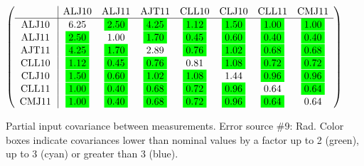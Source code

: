 \begin{table}[H]
\scriptsize
\begin{center}
\renewcommand{\arraystretch}{1.1}
\begin{math}\left(\begin{array}{c|ccccccc}
 & \mathrm{ALJ10} & 
\mathrm{ALJ11} & 
\mathrm{AJT11} & 
\mathrm{CLL10} & 
\mathrm{CLJ10} & 
\mathrm{CLL11} & 
\mathrm{CMJ11} \\
\hline
\mathrm{ALJ10} \hspace*{2pt} &       6.25 &  \colorbox{Green1}{$      2.50$} &  \colorbox{Green1}{$      4.25$} &  \colorbox{Green1}{$      1.12$} &  \colorbox{Green1}{$      1.50$} &  \colorbox{Green1}{$      1.00$} &  \colorbox{Green1}{$      1.00$} \\
\mathrm{ALJ11} \hspace*{2pt} &  \colorbox{Green1}{$      2.50$} &       1.00 &  \colorbox{Green1}{$      1.70$} &  \colorbox{Green1}{$      0.45$} &  \colorbox{Green1}{$      0.60$} &  \colorbox{Green1}{$      0.40$} &  \colorbox{Green1}{$      0.40$} \\
\mathrm{AJT11} \hspace*{2pt} &  \colorbox{Green1}{$      4.25$} &  \colorbox{Green1}{$      1.70$} &       2.89 &  \colorbox{Green1}{$      0.76$} &  \colorbox{Green1}{$      1.02$} &  \colorbox{Green1}{$      0.68$} &  \colorbox{Green1}{$      0.68$} \\
\mathrm{CLL10} \hspace*{2pt} &  \colorbox{Green1}{$      1.12$} &  \colorbox{Green1}{$      0.45$} &  \colorbox{Green1}{$      0.76$} &       0.81 &  \colorbox{Green1}{$      1.08$} &  \colorbox{Green1}{$      0.72$} &  \colorbox{Green1}{$      0.72$} \\
\mathrm{CLJ10} \hspace*{2pt} &  \colorbox{Green1}{$      1.50$} &  \colorbox{Green1}{$      0.60$} &  \colorbox{Green1}{$      1.02$} &  \colorbox{Green1}{$      1.08$} &       1.44 &  \colorbox{Green1}{$      0.96$} &  \colorbox{Green1}{$      0.96$} \\
\mathrm{CLL11} \hspace*{2pt} &  \colorbox{Green1}{$      1.00$} &  \colorbox{Green1}{$      0.40$} &  \colorbox{Green1}{$      0.68$} &  \colorbox{Green1}{$      0.72$} &  \colorbox{Green1}{$      0.96$} &       0.64 &  \colorbox{Green1}{$      0.64$} \\
\mathrm{CMJ11} \hspace*{2pt} &  \colorbox{Green1}{$      1.00$} &  \colorbox{Green1}{$      0.40$} &  \colorbox{Green1}{$      0.68$} &  \colorbox{Green1}{$      0.72$} &  \colorbox{Green1}{$      0.96$} &  \colorbox{Green1}{$      0.64$} &       0.64 \\
\end{array}\right)\end{math}
\caption{Partial input covariance between measurements. Error source \#9: Rad. Color boxes indicate covariances lower than nominal values by a factor up to 2 (green), up to 3 (cyan) or greater than 3 (blue).}
\renewcommand{\arraystretch}{1}
\end{center}
\end{table}
